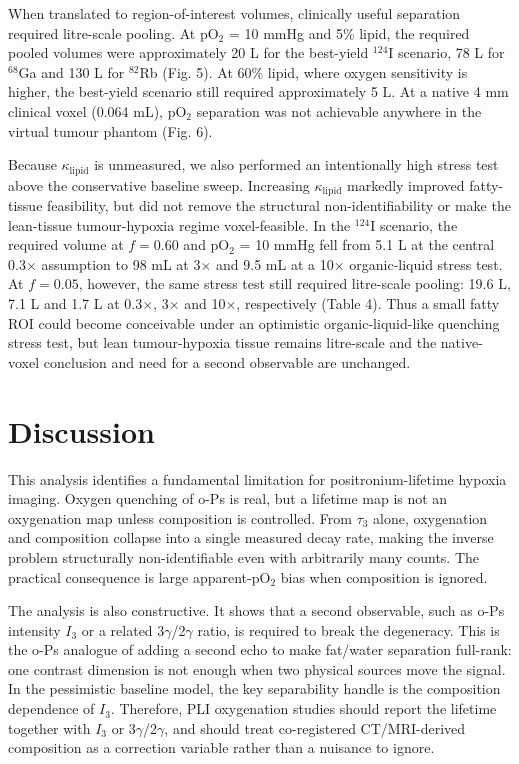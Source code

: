 \documentclass[pdflatex,sn-mathphys-num]{sn-jnl}
\begin{document}
When translated to region-of-interest volumes, clinically useful separation required litre-scale pooling. At pO\(_2\) = 10 mmHg and 5\% lipid, the required pooled volumes were approximately 20 L for the best-yield \(^{124}\)I scenario, 78 L for \(^{68}\)Ga and 130 L for \(^{82}\)Rb (Fig. 5). At 60\% lipid, where oxygen sensitivity is higher, the best-yield scenario still required approximately 5 L. At a native 4 mm clinical voxel (0.064 mL), pO\(_2\) separation was not achievable anywhere in the virtual tumour phantom (Fig. 6).

Because \(\kappa_{\mathrm{lipid}}\) is unmeasured, we also performed an intentionally high stress test above the conservative baseline sweep. Increasing \(\kappa_{\mathrm{lipid}}\) markedly improved fatty-tissue feasibility, but did not remove the structural non-identifiability or make the lean-tissue tumour-hypoxia regime voxel-feasible. In the \(^{124}\)I scenario, the required volume at \(f=0.60\) and pO\(_2\) = 10 mmHg fell from 5.1 L at the central 0.3\(\times\) assumption to 98 mL at 3\(\times\) and 9.5 mL at a 10\(\times\) organic-liquid stress test. At \(f=0.05\), however, the same stress test still required litre-scale pooling: 19.6 L, 7.1 L and 1.7 L at 0.3\(\times\), 3\(\times\) and 10\(\times\), respectively (Table 4). Thus a small fatty ROI could become conceivable under an optimistic organic-liquid-like quenching stress test, but lean tumour-hypoxia tissue remains litre-scale and the native-voxel conclusion and need for a second observable are unchanged.

\section{Discussion}\label{discussion}

This analysis identifies a fundamental limitation for positronium-lifetime hypoxia imaging. Oxygen quenching of o-Ps is real, but a lifetime map is not an oxygenation map unless composition is controlled. From \(\tau_3\) alone, oxygenation and composition collapse into a single measured decay rate, making the inverse problem structurally non-identifiable even with arbitrarily many counts. The practical consequence is large apparent-pO\(_2\) bias when composition is ignored.

The analysis is also constructive. It shows that a second observable, such as o-Ps intensity \(I_3\) or a related 3\(\gamma\)/2\(\gamma\) ratio, is required to break the degeneracy. This is the o-Ps analogue of adding a second echo to make fat/water separation full-rank: one contrast dimension is not enough when two physical sources move the signal. In the pessimistic baseline model, the key separability handle is the composition dependence of \(I_3\). Therefore, PLI oxygenation studies should report the lifetime together with \(I_3\) or 3\(\gamma\)/2\(\gamma\), and should treat co-registered CT/MRI-derived composition as a correction variable rather than a nuisance to ignore.
\end{document}
